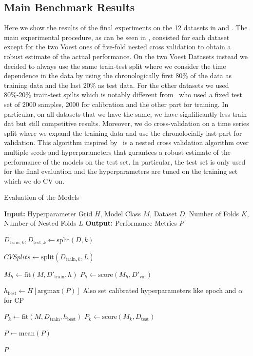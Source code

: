 \subsection{Main Benchmark Results}
Here we show the results of the final experiments on the 12 datasets in  and . The main experimental procedure, as can be seen in , consisted for each dataset except for the two Voest ones of five-fold nested cross validation to obtain a robust estimate of the actual performance. On the two Voest Datasets instead we decided to always use the same train-test split where we consider the time dependence in the data by using the chronologically first 80\% of the data as training data and the last 20\% as test data. For the other datasets we used 80\%-20\% train-test spilts which is notably different from~\cite{sesia2021conformal} who used a fixed test set of 2000 samples, 2000 for calibration and the other part for training. In particular, on all datasets that we have the same, we have signlificantly less train dat but still competitive results.  Moreover, we do cross-validation on a time series split where we expand the training data and use the chronolocially last part for validation. This algorithm inspired by~\cite{rothfuss2019noise} is a nested cross validation algorithm over multiple seeds and hyperparameters that gurantees a robust estimate of the performance of the models on the test set. In particular, the test set is only used for the final evaluation and the hyperparameters are tuned on the training set which we do CV on.

\begin{algorithm}
    \caption{Evaluation of the Models}\label{alg:evaluation}
    \begin{algorithmic}
        \STATE\textbf{Input:} Hyperparameter Grid $H$, Model Class $M$, Dataset $D$, Number of Folds $K$, Number of Nested Folds $L$
        \STATE\textbf{Output:} Performance Metrics $P$

        \STATE$D_{\text{train}, k}, D_{\text{test}, k} \leftarrow \text{split}(D, k)$

        \STATE$CVSplits \leftarrow \text{split}(D_{\text{train}, k}, L)$

        \STATE$M_h \leftarrow \text{fit}(M, D'_{\text{train}}, h)$
        \STATE$P_h \leftarrow \text{score}(M_h, D'_{\text{val}})$
        \ENDFOR%
        \ENDFOR%

        \STATE$h_{\text{best}} \leftarrow H[\text{argmax}(P)]$ Also set calibrated hyperparameters like epoch and $\alpha$ for CP

        \STATE$P_k \leftarrow \text{fit}(M, D_{\text{train}}, h_{\text{best}})$
        \STATE$P_k \leftarrow \text{score}(M_k, D_{\text{test}})$
        \ENDFOR%

        \STATE$P \leftarrow \text{mean}(P)$

        \RETURN$P$
    \end{algorithmic}
\end{algorithm}

